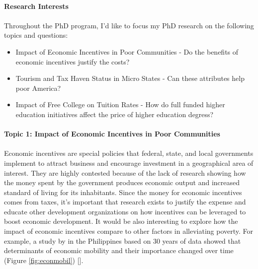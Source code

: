 \documentclass{article}
\begin{document}
    \paragraph*{Research Interests}   \par
   \paragraph{} Throughout the PhD program, I'd like to focus my PhD research on the following topics and questions:
    \begin{itemize}
        \item Impact of Economic Incentives in Poor Communities - Do the benefits of economic incentives justify the costs?
        \item Tourism and Tax Haven Status in Micro States - Can these attributes help poor America?
        \item Impact of Free College on Tuition Rates - How do full funded higher education initiatives affect the price of higher education degress?
    \end{itemize}

\paragraph*{Topic 1: Impact of Economic Incentives in Poor Communities}
\paragraph{}Economic incentives are special policies that federal, state, and local governments implement to attract business and encourage investment in a geographical area of interest. 
They are highly contested because of the lack of research showing how the money spent by the government produces economic output and increased standard of living for its inhabitants.
Since the money for economic incentives comes from taxes, it's important that research exists to justify the expense and educate other development organizations on how incentives can be leveraged to boost economic development.
It would be also interesting to explore how the impact of economic incentives compare to other factors in alleviating poverty.
For example, a study by  in the Philippines based on 30 years of data showed that determinants of economic mobility and their importance changed over time (Figure \ref{fig:econmobil}) [\cite{fuwa2007pathways}]. \\
\end{document}
